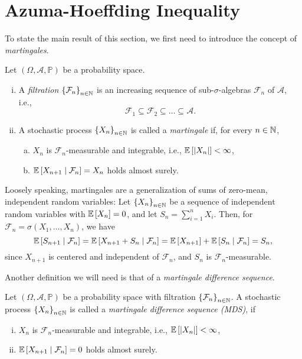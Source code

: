 \section{Azuma-Hoeffding Inequality}

To state the main result of this section, we first need to introduce the concept of \emph{martingales}.

\begin{definition}
Let $(\Omega, \mathcal{A}, \mathbb{P})$ be a probability space.
\begin{enumerate}[(i)]
    \item A \emph{filtration} $\left\{\mathcal{F}_n\right\}_{n \in \mathbb{N}}$ is an increasing sequence of sub-$\sigma$-algebras $\mathcal{F}_n$ of $\mathcal{A}$, i.e.,
    \[
        \mathcal{F}_1 \subseteq \mathcal{F}_2 \subseteq \dots \subseteq \mathcal{A}.
    \]

    \item A stochastic process $\left\{X_n\right\}_{n \in \mathbb{N}}$ is called a \emph{martingale} if, for every $n \in \mathbb{N}$,
    \begin{enumerate}[(a)]
        \item $X_n$ is $\mathcal{F}_n$-measurable and integrable, i.e., $\mathbb{E}\left[\abs{X_n}\right] < \infty$,

        \item $\mathbb{E}\left[X_{n+1} \mathrel{|} \mathcal{F}_n\right] = X_n$ holds almost surely.
    \end{enumerate}
\end{enumerate}
\end{definition}

Loosely speaking, martingales are a generalization of sums of zero-mean, independent random variables: Let $\left\{X_n\right\}_{n \in \mathbb{N}}$ be a sequence of independent random variables with $\mathbb{E}\left[X_n\right] = 0$, and let $S_n = \sum_{i=1}^n X_i$. Then, for $\mathcal{F}_n = \sigma(X_1, \dots, X_n)$, we have
\[
    \mathbb{E}\left[S_{n+1} \mathrel{|} \mathcal{F}_n\right] = \mathbb{E}\left[X_{n+1} + S_n \mathrel{|} \mathcal{F}_n\right] = \mathbb{E}\left[X_{n+1}\right] + \mathbb{E}\left[S_n \mathrel{|} \mathcal{F}_n\right] = S_n,
\]
since $X_{n+1}$ is centered and independent of $\mathcal{F}_n$, and $S_n$ is $\mathcal{F}_n$-measurable.

Another definition we will need is that of a \emph{martingale difference sequence}.

\begin{definition}
Let $(\Omega, \mathcal{A}, \mathbb{P})$ be a probability space with filtration $\left\{\mathcal{F}_n\right\}_{n \in \mathbb{N}}$. A stochastic process $\left\{X_n\right\}_{n\in\mathbb{N}}$ is called a \emph{martingale difference sequence (MDS)}, if
\begin{enumerate}[(i)]
    \item $X_n$ is $\mathcal{F}_n$-measurable and integrable, i.e., $\mathbb{E}\left[\abs{X_n}\right] < \infty$,

    \item $\mathbb{E}\left[X_{n+1} \mathrel{|} \mathcal{F}_n\right] = 0$ holds almost surely.
\end{enumerate}
\end{definition}

